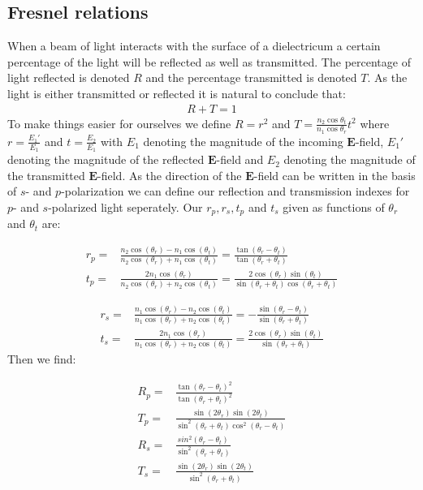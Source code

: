\subsection{Fresnel relations}
When a beam of light interacts with the surface of a dielectricum a certain percentage of the light will be reflected as well as transmitted. The percentage of light reflected is denoted $R$ and the percentage transmitted is denoted $T$. As the light is either transmitted or reflected it is natural to conclude that:
%
\begin{align}
R+T=1
\end{align}
%
To make things easier for ourselves we define $R=r^2$ and $T=\frac{n_2\cos{\theta_t}}{n_1\cos{\theta_r}}t^2$ where $r=\frac{E_1'}{E_1}$ and  $t=\frac{E_2}{E_1}$ with $E_1$ denoting the magnitude of the incoming $\textbf{E}$-field, $E_1'$ denoting the magnitude of the reflected $\textbf{E}$-field and $E_2$ denoting the magnitude of the transmitted $\textbf{E}$-field. As the direction of the $\textbf{E}$-field can be written in the basis of $s$- and $p$-polarization we can define our reflection and transmission indexes for $p$- and $s$-polarized light seperately. Our $r_p,r_s,t_p$ and $t_s$ given as functions of $\theta_r$ and $\theta_t$ are:

\begin{align}
r_p = & \frac{n_{2}\cos(\theta_r)-n_1\cos(\theta_t)}{n_2\cos(\theta_r)+n_1\cos(\theta_t)} = \frac{\tan(\theta_r-\theta_t)}{\tan(\theta_r+\theta_t)}\\
%
t_p = & \frac{2n_1\cos(\theta_r)}{n_2\cos(\theta_r)+n_2\cos(\theta_t)} 
= \frac{2\cos(\theta_r)\sin(\theta_t)}{\sin(\theta_r+\theta_t)\cos(\theta_r+\theta_t)}
\end{align}

\begin{align}
r_s = & \frac{n_1\cos(\theta_r)-n_2\cos(\theta_t)}{n_1\cos(\theta_r)+n_2\cos(\theta_t)}= -\frac{\sin(\theta_r-\theta_t)}{\sin(\theta_r+\theta_t)}\\
%
t_s = & \frac{2n_1\cos(\theta_r)}{n_1\cos(\theta_r)+n_2\cos(\theta_t)} = \frac{2\cos(\theta_r)\sin(\theta_t)}{\sin(\theta_r+\theta_t)}
\end{align}
%
Then we find:

\begin{align}
R_p = & \frac{\tan(\theta_r-\theta_t)^2}{\tan(\theta_r+\theta_t)^2}\\
T_p = & \frac{\sin(2\theta_r)\sin(2\theta_t)}{\sin^2(\theta_r+\theta_t)\cos^2(\theta_r-\theta_t)}\\
R_s = & \frac{sin^2(\theta_r-\theta_t)}{\sin^2(\theta_r+\theta_t)}\\
T_s = & \frac{\sin(2\theta_r)\sin(2\theta_t)}{\sin^2(\theta_r+\theta_t)}
\end{align}

	







